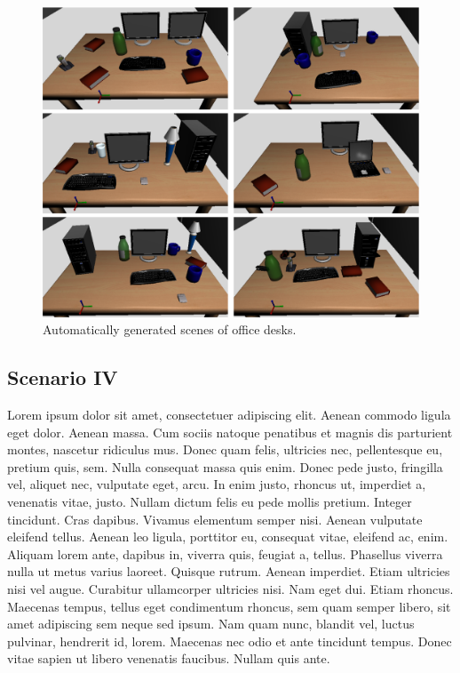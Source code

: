 \documentclass[conference]{IEEEtran}
\begin{document}
\begin{figure}[tb]
  \centering
  \includegraphics[width=.9\columnwidth]{figs/scenes.png}
  \caption{Automatically generated scenes of office desks.}
  \label{fig:simulated-desktop-scenes}
\end{figure}

\subsection{Scenario IV}
\label{scenario4}

Lorem ipsum dolor sit amet, consectetuer adipiscing elit. Aenean commodo ligula
eget dolor. Aenean massa. Cum sociis natoque penatibus et magnis dis parturient
montes, nascetur ridiculus mus. Donec quam felis, ultricies nec, pellentesque
eu, pretium quis, sem. Nulla consequat massa quis enim. Donec pede justo,
fringilla vel, aliquet nec, vulputate eget, arcu. In enim justo, rhoncus ut,
imperdiet a, venenatis vitae, justo. Nullam dictum felis eu pede mollis pretium.
Integer tincidunt. Cras dapibus. Vivamus elementum semper nisi. Aenean vulputate
eleifend tellus. Aenean leo ligula, porttitor eu, consequat vitae, eleifend ac,
enim. Aliquam lorem ante, dapibus in, viverra quis, feugiat a, tellus. Phasellus
viverra nulla ut metus varius laoreet. Quisque rutrum. Aenean imperdiet. Etiam
ultricies nisi vel augue. Curabitur ullamcorper ultricies nisi. Nam eget dui.
Etiam rhoncus. Maecenas tempus, tellus eget condimentum rhoncus, sem quam semper
libero, sit amet adipiscing sem neque sed ipsum. Nam quam nunc, blandit vel,
luctus pulvinar, hendrerit id, lorem. Maecenas nec odio et ante tincidunt
tempus. Donec vitae sapien ut libero venenatis faucibus. Nullam quis ante. 
\end{document}
